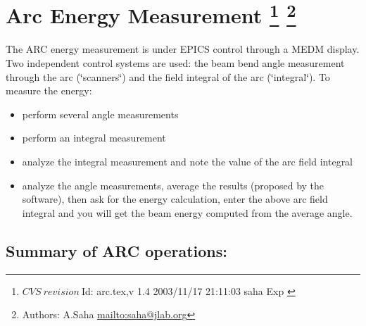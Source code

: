 \section[Arc Energy Measurement]{Arc Energy Measurement
\footnote{
  $CVS~revision~ $Id: arc.tex,v 1.4 2003/11/17 21:11:03 saha Exp $ $
}
\footnote{Authors: A.Saha \url{mailto:saha@jlab.org}}
}

\providecommand{\LyX}{L\kern-.1667em\lower.25em\hbox{Y}\kern-.125emX\@}

\newenvironment{lyxlist}[1]
  {\begin{list}{}
    {\settowidth{\labelwidth}{#1}
     \setlength{\leftmargin}{\labelwidth}
     \addtolength{\leftmargin}{\labelsep}
     \renewcommand{\makelabel}[1]{##1 \hfill}}}
  {\end{list}}

\newenvironment{lyxcode}
  {\begin{list}{}{
    \setlength{\rightmargin}{\leftmargin}
    \raggedright
    \setlength{\itemsep}{0pt}
    \setlength{\parsep}{0pt}
    \ttfamily}%
   \item[]}
  {\end{list}}

The ARC energy measurement is under EPICS control through a MEDM display. Two
independent control systems are used: the beam bend angle measurement through
the arc (\char`\"{}scanners\char`\"{}) and the field integral of
the arc (\char`\"{}integral\char`\"{}). To measure the energy: 

\begin{itemize}
\item perform several angle measurements 
\item perform an integral measurement 
\item analyze the integral measurement and note the value of the arc field 
integral 
\item analyze the angle measurements, average the results (proposed by the 
software),
then ask for the energy calculation, enter the above arc field integral and
you will get the beam energy computed from the average angle. 
\end{itemize}

\vspace{0.3cm}

\subsection{Summary of ARC operations: }

